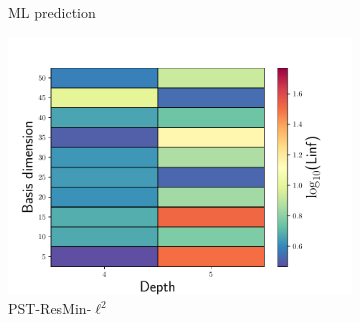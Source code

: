 \documentclass[3p,computermodern,10pt]{elsarticle}
\begin{document}
\begin{figure}
\begin{center}
\begin{subfigure}[t]{0.32\textwidth}
\caption{ML prediction}
\label{fig:burg_rom_results3}
\end{subfigure}
\begin{subfigure}[t]{0.32\textwidth}
\includegraphics[trim={0cm 0cm 0cm 0cm},clip,width=1.0\linewidth]{code/burgers/synapse_models/basis_study/results_hyperreduction/Linf_LS.pdf}
\caption{PST-ResMin-$\ell^2$}
\label{fig:burg_rom_results7}
\end{subfigure}
\begin{subfigure}[t]{0.32\textwidth}

\end{subfigure}
\end{center}
\end{figure}
\end{document}
